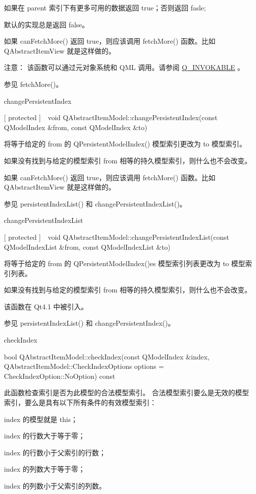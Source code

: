 如果在 parent 索引下有更多可用的数据返回 true；否则返回 fasle;

默认的实现总是返回 false。

如果 canFetchMore() 返回 true，则应该调用 fetchMore() 函数。比如 QAbstractItemView 就是这样做的。

注意： 该函数可以通过元对象系统和 QML 调用。请参阅 \href{}{Q\_INVOKABLE} 。

参见 fetchMore()。

changePersistentIndex

[ protected ] void QAbstractItemModel::changePersistentIndex(const QModelIndex \&from, const QModelIndex \&to)

将等于给定的 from 的 QPersistentModelIndex() 模型索引更改为 to 模型索引。

如果没有找到与给定的模型索引 from 相等的持久模型索引，则什么也不会改变。

如果 canFetchMore() 返回 true，则应该调用 fetchMore() 函数。比如 QAbstractItemView 就是这样做的。

参见 persistentIndexList() 和 changePersistentIndexList()。

changePersistentIndexList

[ protected ] void QAbstractItemModel::changePersistentIndexList(const QModelIndexList \&from, const QModelIndexList \&to)

将等于给定的 from 的 QPersistentModelIndex()es 模型索引列表更改为 to 模型索引列表。

如果没有找到与给定的模型索引 from 相等的持久模型索引，则什么也不会改变。

该函数在 Qt4.1 中被引入。

参见 persistentIndexList() 和 changePersistentIndex()。

checkIndex

bool QAbstractItemModel::checkIndex(const QModelIndex \&index, QAbstractItemModel::CheckIndexOptions options = CheckIndexOption::NoOption) const

此函数检查索引是否为此模型的合法模型索引。 合法模型索引要么是无效的模型索引，要么是具有以下所有条件的有效模型索引：

\begin{compactitem}
\item index 的模型就是 this；
\item index 的行数大于等于零；
\item index 的行数小于父索引的行数；
\item index 的列数大于等于零；
\item index 的列数小于父索引的列数。
\end{compactitem}

